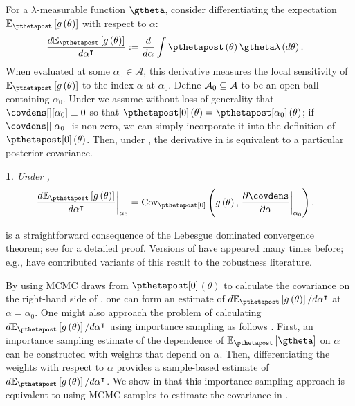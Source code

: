 \documentclass{article}\usepackage[]{graphicx}\usepackage[]{color}
\theoremstyle{definition}
\theoremstyle{plain}
\theoremstyle{plain}
\newtheorem{thm}{\protect\theoremname}
\theoremstyle{plain}
\theoremstyle{definition}
\theoremstyle{plain}
\theoremstyle{plain}
\providecommand{\theoremname}{Theorem}
\begin{document}
For a $\lambda$-measurable function $\gtheta$, consider differentiating
the expectation $\mbe_{\pthetapost}\left[g\left(\theta\right)\right]$
with respect to $\alpha$:
\begin{align}
    \label{eq:dg_dalpha}
\frac{d\mbe_{\pthetapost}\left[
    g\left(\theta\right)\right]}{d\alpha^{\trans}} &
    :=\frac{d}{d\alpha}\int \pthetapost\left(\theta\right)
    \gtheta\lambda\left(d\theta\right).
\end{align}
When evaluated at some $\alpha_{0} \in \mathcal{A}$, this derivative measures
the local sensitivity of $\mbe_{\pthetapost}\left[g\left(\theta\right)\right]$
to the index $\alpha$ at $\alpha_{0}$. Define
$\mathcal{A}_{0}\subseteq\mathcal{A}$ to be an open ball containing $\alpha_{0}$.
Under  we assume without loss of generality that
$\covdens[][\alpha_0] \equiv 0$ so that $\pzeropost\left(\theta\right) =
\pthetapost[\alpha_{0}]\left(\theta\right)$; if $\covdens[][\alpha_0]$ is
non-zero, we can simply incorporate it into the definition of
$\pzeropost\left(\theta\right)$. Then, under ,
the derivative in  is equivalent to a particular
posterior covariance.
\begin{thm}
\label{thm:sens_cov}Under  ,
\begin{align}
\left.\frac{d\mbe_{\pthetapost}
    \left[g\left(\theta\right)\right]}
    {d\alpha^{\trans}}\right|_{\alpha_{0}} &
    =\cov_{\pzeropost}\left(g\left(\theta\right),
    \left.\frac{\partial\covdens}{\partial\alpha}\right|_{\alpha_{0}}\right).
    \label{eq:covariance_sensitivity_general}
\end{align}
\end{thm}  is a straightforward consequence of the
Lebesgue dominated convergence theorem; see  for a
detailed proof. Versions of  have appeared many times
before; e.g.,
\citet{diaconis:1986:consistency,basu:1996:local,gustafson:1996:localposterior,perez:2006:mcmc}
have contributed variants of this result to the robustness literature.

By using MCMC draws from $\pzeropost$$\left(\theta\right)$ to calculate the
covariance on the right-hand side of
, one can form an estimate of
$d\mbe_{\pthetapost}\left[g\left(\theta\right)\right]/d\alpha^{\trans}$ at
$\alpha=\alpha_{0}$. One might also approach the problem of calculating
$d\mbe_{\pthetapost}\left[g\left(\theta\right)\right]/d\alpha^{\trans}$ using
importance sampling as follows \citep[Chapter 9]{owen:2013:mcmcbook}. First, an
importance sampling estimate of the dependence of
$\mbe_{\pthetapost}\left[\gtheta\right]$ on $\alpha$ can be constructed with
weights that depend on $\alpha$. Then, differentiating the weights with
respect to $\alpha$ provides a sample-based estimate of
$d\mbe_{\pthetapost}\left[g\left(\theta\right)\right]/d\alpha^{\trans}$. We show
in  that this importance sampling
approach is equivalent to using MCMC samples to estimate the covariance in
.
\end{document}
